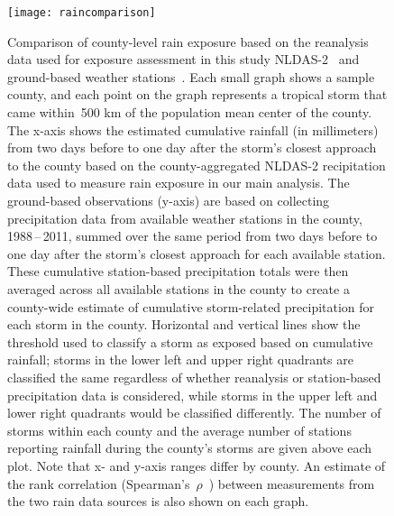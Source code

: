 \begin{figure}[tbhp!] \centering
\texttt{[image: raincomparison]} \caption{Comparison of
county-level rain exposure based on the reanalysis data used for exposure
assessment in this study \ac{NLDAS-2}~\parencite{rui2013nldas,
alhamdan2014environmental} and ground-based weather
stations~\parencite{menne2012overview, rnoaa, countyweather}. Each small graph
shows a sample county, and each point on the graph represents a tropical storm
that came within~500 \si{\kilo\metre} of the population mean center of the county.
The x-axis shows the estimated cumulative rainfall (in millimeters) from two
days before to one day after the storm's closest approach to the county based
on the county-aggregated \ac{NLDAS-2} recipitation data used to measure rain
exposure in our main analysis. The ground-based observations (y-axis) are based
on collecting precipitation data from available weather stations in the county,
1988\,--\,2011, summed over the same period from two days before to one day
after the storm's closest approach for each available station. These cumulative
station-based precipitation totals were then averaged across all available
stations in the county to create a county-wide estimate of cumulative
storm-related precipitation for each storm in the county. Horizontal and
vertical lines show the threshold used to classify a storm as exposed based on
cumulative rainfall; storms in the lower left and upper right quadrants are
classified the same regardless of whether reanalysis or station-based
precipitation data is considered, while storms in the upper left and lower
right quadrants would be classified differently. The number of storms within
each county and the average number of stations reporting rainfall during the
county's storms are given above each plot. Note that x- and y-axis ranges
differ by county. An estimate of the rank correlation
(Spearman's~$\rho$~\parencite{spearman1904proof}) between measurements from the two
rain data sources is also shown on each graph.} \label{fig:raincomparison}
\end{figure}

